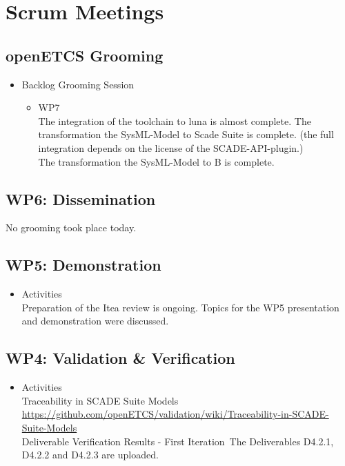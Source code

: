 \documentclass[a4paper, 11pt]{article}
\begin{document}

\section{Scrum Meetings}

\subsection{openETCS Grooming}
\begin{itemize}
\item Backlog Grooming Session\\
\begin{itemize}
\item WP7\\
The integration of the toolchain to luna is almost complete.
The transformation the SysML-Model to Scade Suite is complete. (the full integration depends on the license of the SCADE-API-plugin.)\\
The transformation the SysML-Model to B is complete.


\end{itemize}

\end{itemize}

\subsection{WP6: Dissemination}
No grooming took place today.


\subsection{WP5: Demonstration}
\begin{itemize}
\item Activities\\
Preparation of the Itea review is ongoing. Topics for the WP5 presentation and demonstration were discussed.

\end{itemize}

\subsection{WP4: Validation \& Verification}
\begin{itemize}
\item Activities\\
Traceability in SCADE Suite Models\\
\url{https://github.com/openETCS/validation/wiki/Traceability-in-SCADE-Suite-Models}\\
Deliverable Verification Results - First Iteration\ 
The Deliverables D4.2.1, D4.2.2 and D4.2.3 are uploaded.
\end{itemize}
\end{document}
